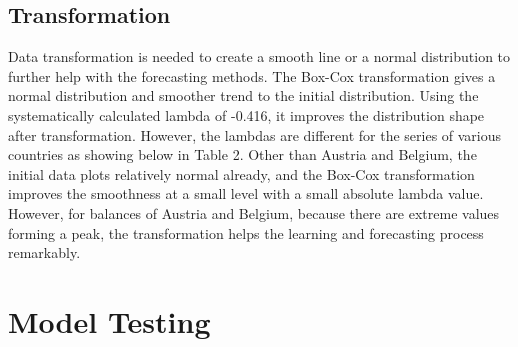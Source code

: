 \documentclass[12pt]{article}
\begin{document}
\subsection{Transformation }
Data transformation is needed to create a smooth line or a normal distribution to further help with the forecasting methods. The Box-Cox transformation gives a normal distribution and smoother trend to the initial distribution. Using the systematically calculated lambda of -0.416, it improves the distribution shape after transformation. However, the lambdas are different for the series of various countries as showing below in Table 2. Other than Austria and Belgium, the initial data plots relatively normal already, and the Box-Cox transformation improves the smoothness at a small level with a small absolute lambda value. However, for balances of Austria and Belgium, because there are extreme values forming a peak, the transformation helps the learning and forecasting process remarkably. 
\begin{table}[!htbp] \centering 
  \caption{Box-Cox Transformation Lambda} 
  \label{} 
\end{table} 

\section{Model Testing}
\end{document}
